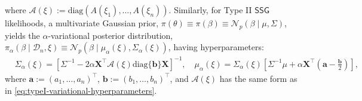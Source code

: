 \documentclass[12pt]{article}
\numberwithin{equation}{section}
\newcommand{\ssg}{\mathsf{SSG}}
\begin{document}
%
where $\mathcal{A}(\xi) := \mathrm{diag}(A(\xi_1), \ldots, A(\xi_n))$. Similarly, for Type II $\ssg$ likelihoods, a {multivariate Gaussian} prior, $\pi(\theta) \equiv \pi(\beta) \equiv \mathcal{N}_p(\beta \mid \mu, \Sigma)$, yields the $\alpha$-variational posterior distribution, $\pi_{\alpha}(\beta \mid \mathcal{D}_n, \xi) \equiv \mathcal{N}_p(\beta\mid \mu_{\alpha}(\xi), \Sigma_{\alpha}(\xi))$, having hyperparameters:
%
\begin{equation}\label{eq:typeII-variational-hyperparameters}
\begin{split}
&\Sigma_{\alpha}(\xi) = \left[\Sigma^{-1} - 2\alpha \mathbf{X}^{\top}\mathcal{A}(\xi)\mathrm{diag}\{\mathbf{b}\}\mathbf{X}\right]^{-1},\quad
\mu_{\alpha}(\xi) = \Sigma_{\alpha}(\xi)\left[\Sigma^{-1}\mu + \alpha \mathbf{X}^{\top}\left(\mathbf{a} - \frac{\mathbf{b}}{2}\right)\right],
\end{split}    
\end{equation}
%
where $\mathbf{a} := (a_1, \dots, a_n)^{\top}$, $\mathbf{b} := (b_1, \dots, b_n)^{\top}$, and $\mathcal{A}(\xi)$ has the same form as in \eqref{eq:typeI-variational-hyperparameters}.
\end{document}
